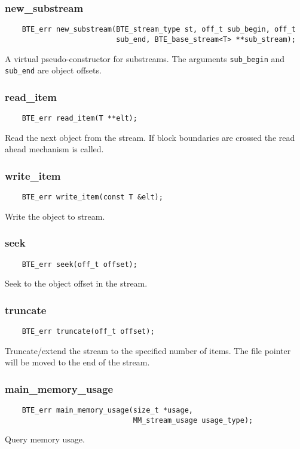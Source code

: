 \subsubsection{new\_substream}
\begin{verbatim}
    BTE_err new_substream(BTE_stream_type st, off_t sub_begin, off_t
                          sub_end, BTE_base_stream<T> **sub_stream);
\end{verbatim}
A virtual pseudo-constructor for substreams. The arguments \verb|sub_begin| and
\verb|sub_end| are object offsets.


\subsubsection{read\_item}
\begin{verbatim}
    BTE_err read_item(T **elt);
\end{verbatim}
Read the next object from the stream. If block boundaries are crossed the
read ahead mechanism is called.

\subsubsection{write\_item}
\begin{verbatim}
    BTE_err write_item(const T &elt);
\end{verbatim}
Write the object to stream.


\subsubsection{seek}
\begin{verbatim}
    BTE_err seek(off_t offset);
\end{verbatim}
Seek to the object offset in the stream.


\subsubsection{truncate}
\begin{verbatim}
    BTE_err truncate(off_t offset);
\end{verbatim}
Truncate/extend the stream to the specified number of items. The file
pointer will be moved to the end of the stream.


\subsubsection{main\_memory\_usage}
\begin{verbatim}
    BTE_err main_memory_usage(size_t *usage,
                              MM_stream_usage usage_type);
\end{verbatim}
Query memory usage.



